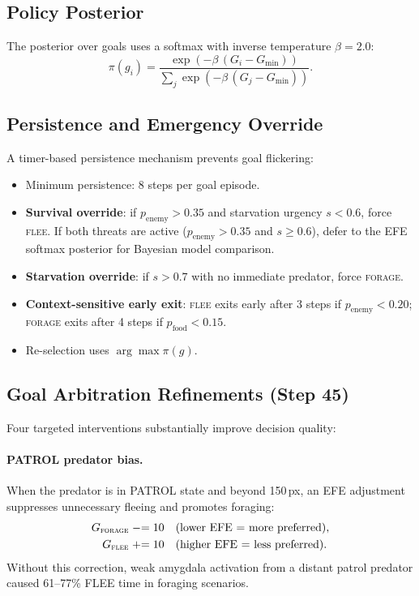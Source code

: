 \documentclass[11pt,a4paper]{article}
\begin{document}
\subsection{Policy Posterior}

The posterior over goals uses a softmax with inverse temperature $\beta = 2.0$:
\begin{equation}\label{eq:posterior}
  \pi(g_i) = \frac{\exp(-\beta\,(G_i - G_\text{min}))}
                   {\sum_j \exp(-\beta\,(G_j - G_\text{min}))}.
\end{equation}

\subsection{Persistence and Emergency Override}

A timer-based persistence mechanism prevents goal flickering:
\begin{itemize}[nosep]
  \item Minimum persistence: 8 steps per goal episode.
  \item \textbf{Survival override}: if $p_\text{enemy} > 0.35$ and
    starvation urgency $s < 0.6$, force \textsc{flee}.
    If both threats are active ($p_\text{enemy} > 0.35$ and $s \geq 0.6$),
    defer to the EFE softmax posterior for Bayesian model comparison.
  \item \textbf{Starvation override}: if $s > 0.7$ with no immediate
    predator, force \textsc{forage}.
  \item \textbf{Context-sensitive early exit}: \textsc{flee} exits early after
    3 steps if $p_\text{enemy} < 0.20$; \textsc{forage} exits after 4 steps if
    $p_\text{food} < 0.15$.
  \item Re-selection uses $\arg\max \pi(g)$.
\end{itemize}

\subsection{Goal Arbitration Refinements (Step 45)}\label{sec:goal_refinements}

Four targeted interventions substantially improve decision quality:

\paragraph{PATROL predator bias.}
When the predator is in PATROL state and beyond 150\,px, an EFE adjustment
suppresses unnecessary fleeing and promotes foraging:
\begin{align*}
  G_\textsc{forage} &\mathrel{-}= 10 \quad\text{(lower EFE = more preferred)}, \\
  G_\textsc{flee}   &\mathrel{+}= 10 \quad\text{(higher EFE = less preferred)}.
\end{align*}
Without this correction, weak amygdala activation from a distant patrol
predator caused 61--77\% FLEE time in foraging scenarios.
\end{document}
